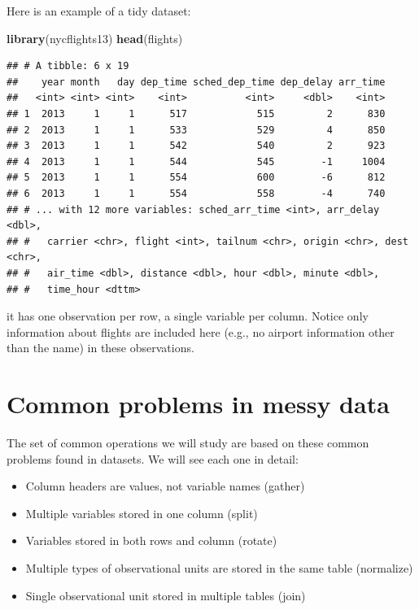 \documentclass[12pt,]{book}
\newenvironment{Shaded}{\begin{snugshade}}{\end{snugshade}}
\newcommand{\KeywordTok}[1]{\textcolor[rgb]{0.13,0.29,0.53}{\textbf{#1}}}
\newcommand{\NormalTok}[1]{#1}
\providecommand{\tightlist}{%
  \setlength{\itemsep}{0pt}\setlength{\parskip}{0pt}}
\theoremstyle{definition}
\theoremstyle{definition}
\theoremstyle{remark}
\begin{document}
Here is an example of a tidy dataset:

\begin{Shaded}
\begin{Highlighting}[]
\KeywordTok{library}\NormalTok{(nycflights13)}
\KeywordTok{head}\NormalTok{(flights)}
\end{Highlighting}
\end{Shaded}

\begin{verbatim}
## # A tibble: 6 x 19
##    year month   day dep_time sched_dep_time dep_delay arr_time
##   <int> <int> <int>    <int>          <int>     <dbl>    <int>
## 1  2013     1     1      517            515         2      830
## 2  2013     1     1      533            529         4      850
## 3  2013     1     1      542            540         2      923
## 4  2013     1     1      544            545        -1     1004
## 5  2013     1     1      554            600        -6      812
## 6  2013     1     1      554            558        -4      740
## # ... with 12 more variables: sched_arr_time <int>, arr_delay <dbl>,
## #   carrier <chr>, flight <int>, tailnum <chr>, origin <chr>, dest <chr>,
## #   air_time <dbl>, distance <dbl>, hour <dbl>, minute <dbl>,
## #   time_hour <dttm>
\end{verbatim}

it has one observation per row, a single variable per column. Notice
only information about flights are included here (e.g., no airport
information other than the name) in these observations.

\section{Common problems in messy
data}\label{common-problems-in-messy-data}

The set of common operations we will study are based on these common
problems found in datasets. We will see each one in detail:

\begin{itemize}
\tightlist
\item
  Column headers are values, not variable names (gather)\\
\item
  Multiple variables stored in one column (split)\\
\item
  Variables stored in both rows and column (rotate)\\
\item
  Multiple types of observational units are stored in the same table
  (normalize)\\
\item
  Single observational unit stored in multiple tables (join)
\end{itemize}
\end{document}
